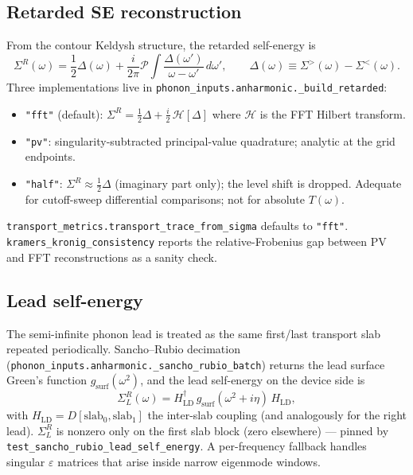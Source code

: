 \subsection{Retarded SE reconstruction}
\label{ap:fa_obs_retarded_se}

From the contour Keldysh structure, the retarded self-energy is
\begin{equation}
  \Sigma^R(\omega) = \frac{1}{2}\Delta(\omega) + \frac{i}{2\pi}
    \mathcal{P}\!\!\int\frac{\Delta(\omega')}{\omega - \omega'}\,d\omega',
  \qquad \Delta(\omega) \equiv \Sigma^>(\omega) - \Sigma^<(\omega).
\end{equation}
Three implementations live in \texttt{phonon\_inputs.anharmonic.\_build\_retarded}:
\begin{itemize}
  \item \texttt{"fft"} (default): $\Sigma^R = \tfrac12\Delta + \tfrac{i}{2}\,
    \mathcal{H}[\Delta]$ where $\mathcal{H}$ is the FFT Hilbert transform.
  \item \texttt{"pv"}: singularity-subtracted principal-value
    quadrature; analytic at the grid endpoints.
  \item \texttt{"half"}: $\Sigma^R \approx \tfrac12\Delta$ (imaginary
    part only); the level shift is dropped.  Adequate for cutoff-sweep
    differential comparisons; not for absolute $T(\omega)$.
\end{itemize}
\texttt{transport\_metrics.transport\_trace\_from\_sigma} defaults to
\texttt{"fft"}.  \texttt{kramers\_kronig\_consistency} reports the
relative-Frobenius gap between PV and FFT reconstructions as a
sanity check.

\subsection{Lead self-energy}
\label{ap:fa_obs_lead}

The semi-infinite phonon lead is treated as the same first/last
transport slab repeated periodically.  Sancho--Rubio decimation
(\texttt{phonon\_inputs.anharmonic.\_sancho\_rubio\_batch}) returns
the lead surface Green's function $g_{\mathrm{surf}}(\omega^2)$, and
the lead self-energy on the device side is
\begin{equation}
  \Sigma^R_L(\omega) = H_{\mathrm{LD}}^\dagger\,
    g_{\mathrm{surf}}(\omega^2 + i\eta)\,H_{\mathrm{LD}},
\end{equation}
with $H_{\mathrm{LD}} = D[\mathrm{slab}_0, \mathrm{slab}_1]$ the
inter-slab coupling (and analogously for the right lead).
$\Sigma^R_L$ is nonzero only on the first slab block (zero
elsewhere) — pinned by \texttt{test\_sancho\_rubio\_lead\_self\_energy}.
A per-frequency fallback handles singular $\varepsilon$ matrices that
arise inside narrow eigenmode windows.


